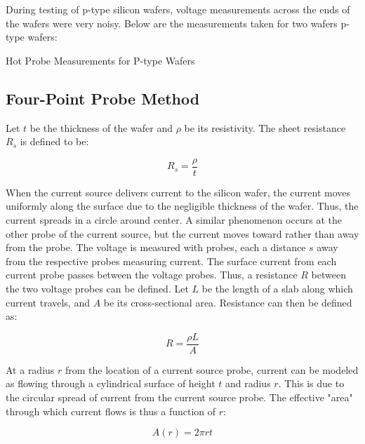 \documentclass{article}
\begin{document}
	During testing of p-type silicon wafers, voltage measurements across the ends of the wafers were very noisy. Below are the measurements taken for two wafers p-type wafers:
	
	\FloatBarrier

	\begin{table}[h!]
		\centering
		\caption{Hot Probe Measurements for P-type Wafers}
		\label{tab:hot_probe_measurements_n_type}
	\end{table}

	\FloatBarrier
	
	\subsection{Four-Point Probe Method}
Let $t$ be the thickness of the wafer and $\rho$ be its resistivity. The sheet resistance $R_s$ is defined to be:

\begin{equation}
\label{eq:rs_def}
R_s = \frac{ \rho }{ t }
\end{equation}

When the current source delivers current to the silicon wafer, the current moves uniformly along the surface due to the negligible thickness of the wafer. Thus, the current spreads in a circle around center. A similar phenomenon occurs at the other probe of the current source, but the current moves toward rather than away from the probe.
The voltage is measured with probes, each a distance $s$ away from the respective probes measuring current. The surface current from each current probe passes between the voltage probes. Thus, a resistance $R$ between the two voltage probes can be defined.
Let $L$ be the length of a slab along which current travels, and $A$ be its cross-sectional area. Resistance can then be defined as:

\begin{equation}
\label{eq:resistance_def}
R = \frac{ \rho L }{ A }
\end{equation}

At a radius $r$ from the location of a current source probe, current can be modeled as flowing through a cylindrical surface of height $t$ and radius $r$. This is due to the circular spread of current from the current source probe. The effective "area" through which current flows is thus a function of $r$:

\begin{equation}
\label{eq:area_fn}
A(r) = 2 \pi r t
\end{equation}
\end{document}
